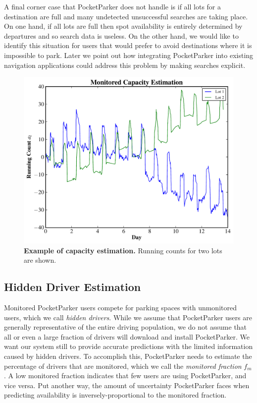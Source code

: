 A final corner case that PocketParker does not handle is if all lots for a
destination are full and many undetected unsuccessful searches are taking
place. On one hand, if all lots are full then spot availability is entirely
determined by departures and so search data is useless. On the other hand, we
would like to identify this situation for users that would prefer to avoid
destinations where it is impossible to park. Later we point out how
integrating PocketParker into existing navigation applications could address
this problem by making searches explicit.

\begin{figure}
\centering
\includegraphics[width=\columnwidth]{./simulator/figures/capacity.pdf}

\caption{\textbf{Example of capacity estimation.} Running counts for two lots
are shown.}

\vspace*{-0.2in}
\label{fig-capacityexample}
\end{figure}

\subsection{Hidden Driver Estimation}

Monitored PocketParker users compete for parking spaces with unmonitored
users, which we call \textit{hidden drivers}. While we assume that
PocketParker users are generally representative of the entire driving
population, we do not assume that all or even a large fraction of drivers
will download and install PocketParker. We want our system still to provide
accurate predictions with the limited information caused by hidden drivers.
To accomplish this, PocketParker needs to estimate the percentage of drivers
that are monitored, which we call the \textit{monitored fraction} $f_m$. A
low monitored fraction indicates that few users are using PocketParker,
and vice versa. Put another way, the amount
of uncertainty PocketParker faces when predicting availability is
inversely-proportional to the monitored fraction.

